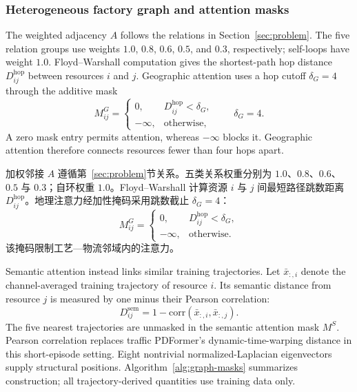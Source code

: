 \documentclass[a4paper,fleqn]{cas-dc}
\newcommand{\zhpara}[1]{%
  \par\begingroup\small\color{black!72}\noindent #1\par\endgroup}
\begin{document}
\subsubsection{Heterogeneous factory graph and attention masks}

The weighted adjacency $A$ follows the relations in Section~\ref{sec:problem}. The five relation groups use weights $1.0$, $0.8$, $0.6$, $0.5$, and $0.3$, respectively; self-loops have weight $1.0$. Floyd--Warshall computation gives the shortest-path hop distance $D^{\mathrm{hop}}_{ij}$ between resources $i$ and $j$. Geographic attention uses a hop cutoff $\delta_G=4$ through the additive mask
\begin{equation}
M^G_{ij}=
\begin{cases}
0, & D^{\mathrm{hop}}_{ij}<\delta_G,\\
-\infty, & \text{otherwise},
\end{cases}
\qquad \delta_G=4.
\end{equation}
A zero mask entry permits attention, whereas $-\infty$ blocks it. Geographic attention therefore connects resources fewer than four hops apart.

\zhpara{加权邻接 $A$ 遵循第~\ref{sec:problem}节关系。五类关系权重分别为 $1.0$、$0.8$、$0.6$、$0.5$ 与 $0.3$；自环权重 $1.0$。Floyd--Warshall 计算资源 $i$ 与 $j$ 间最短路径跳数距离 $D^{\mathrm{hop}}_{ij}$。地理注意力经加性掩码采用跳数截止 $\delta_G=4$：
\begin{equation}
M^G_{ij}=
\begin{cases}
0, & D^{\mathrm{hop}}_{ij}<\delta_G,\\
-\infty, & \text{otherwise}.
\end{cases}
\end{equation}
该掩码限制工艺—物流邻域内的注意力。}


Semantic attention instead links similar training trajectories. Let $\bar x_{:,i}$ denote the channel-averaged training trajectory of resource $i$. Its semantic distance from resource $j$ is measured by one minus their Pearson correlation:
\begin{equation}
D^{\mathrm{sem}}_{ij}
=1-\mathrm{corr}(\bar{x}_{:,i},\bar{x}_{:,j}).
\end{equation}
The five nearest trajectories are unmasked in the semantic attention mask $M^S$. Pearson correlation replaces traffic PDFormer's dynamic-time-warping distance in this short-episode setting. Eight nontrivial normalized-Laplacian eigenvectors supply structural positions. Algorithm~\ref{alg:graph-masks} summarizes construction; all trajectory-derived quantities use training data only.
\end{document}
